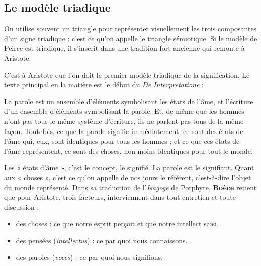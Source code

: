 \subsection{Le modèle triadique}
On utilise souvent un triangle pour représenter visuellement les trois composantes d’un signe triadique : c’est ce qu’on appelle le triangle sémiotique. Si le modèle de Peirce est triadique, il s’inscrit dans une tradition fort ancienne qui remonte à Aristote.

C’est à Aristote que l’on doit le premier modèle triadique de la signification. Le texte principal en la matière est le début du \textit{De Interpretatione} :
\begin{lecture}{}
La parole est un ensemble d’éléments symbolisant les états de l’âme, et l’écriture d’un ensemble d’éléments symbolisant la parole. Et, de même que les hommes n’ont pas tous le même système d’écriture, ils ne parlent pas tous de la même façon. Toutefois, ce que la parole signifie immédiatement, ce sont des états de l’âme qui, eux, sont identiques pour tous les hommes ; et ce que ces états de l’âme représentent, ce sont des choses, non moins identiques pour tout le monde.
\end{lecture}
Les « états d’âme », c’est le concept, le signifié. La parole est le signifiant. Quant aux « choses », c’est ce qu’on appelle de nos jours le référent, c’est-à-dire l’objet du monde représenté. Dans sa traduction de l’\textit{Isagoge} de Porphyre, \textbf{Boèce} retient que pour Aristote, trois facteurs, interviennent dans tout entretien et toute discussion :
\begin{itemize}
\item des choses : ce que notre esprit perçoit et que notre intellect saisi.
\item des pensées (\textit{intellectus}) : ce par quoi nous connaissons.
\item des paroles (\textit{voces}) : ce par quoi nous signifions.
\end{itemize}


